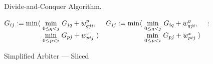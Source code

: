 \begin{paragraph}{Divide-and-Conquer Algorithm.}

\newcommand\plusoneocd{\raisebox{.5pt}{$\scriptstyle+1$}}


\begin{algorithm}
\renewcommand\arraystretch{1.3}
\begin{algorithmic}
\EndProcedure
      
      \State $G_{ij} :=
        \begin{array}[t]{@{}l@{~}l} 
          \min\langle & \underset{0\leq q<j}\min ~ G_{iq} + \yw{qji}, \\
                      & \underset{0\leq p<i}\min ~ G_{pj} + \xw{pij}~\rangle \\         
        \end{array}$
    \EndFor
  \EndFor
      
    \For{$j=\frac{m}{2}\plusoneocd..m$}
      \State $G_{ij} :=
        \begin{array}[t]{@{}l@{~}l} 
          \min\langle & \underset{0\leq q<j}\min ~ G_{iq} + \yw{qji}, \\
                      & \underset{0\leq p<i}\min ~ G_{pj} + \xw{pij}~\rangle \\         
        \end{array}$
    \EndFor
  \EndFor
  \State $\vdots$ 
\end{algorithmic}
\caption{\label{intro:breakdown}
   Simplified Arbiter --- Sliced}
\end{algorithm}


\end{paragraph}
